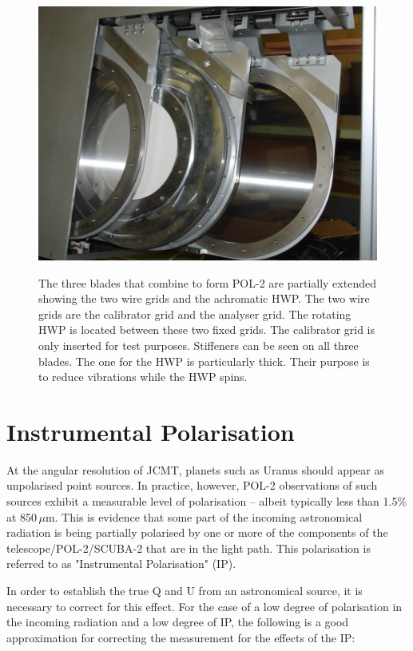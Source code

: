 \begin{figure}[t!]
\begin{center}
\includegraphics[width=0.7\linewidth]{pol2-three-components.png}
\label{fig:pol2components}
\caption [POL-2 components]{
  The three blades that combine to form POL-2 are partially
  extended showing the two wire grids and the achromatic HWP.
  The two wire grids are the calibrator grid and the analyser grid.
  The rotating HWP is located between these two fixed grids.
  The calibrator grid is only inserted for test purposes.
  Stiffeners can be seen on all three blades. The one for the HWP
  is particularly thick. Their purpose is to reduce vibrations while
  the HWP spins.
}
\end{center}
\end{figure}




\section{Instrumental Polarisation}
\label{sec:ip}

At the angular resolution of JCMT, planets such as Uranus should
appear as unpolarised point sources.  In practice, however, POL-2
observations of such sources exhibit a measurable level of
polarisation -- albeit typically less than 1.5\% at 850\,$\mu$m. This
is evidence that some part of the incoming astronomical radiation is
being partially polarised by one or more of the components of the
telescope/POL-2/SCUBA-2 that are in the light path. This polarisation
is referred to as "Instrumental Polarisation" (IP).

In order to establish the true Q and U from an astronomical source, it
is necessary to correct for this effect. For the case of a low degree
of polarisation in the incoming radiation and a low degree of IP, the
following is a good approximation for correcting the measurement for
the effects of the IP:


